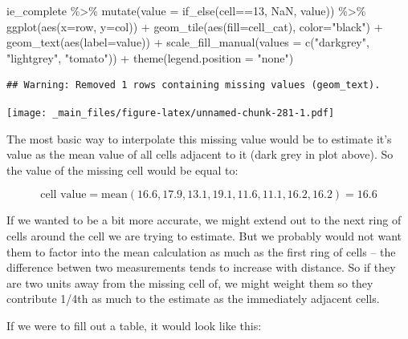 \documentclass[
]{book}
\newenvironment{Shaded}{\begin{snugshade}}{\end{snugshade}}
\newcommand{\AttributeTok}[1]{\textcolor[rgb]{0.77,0.63,0.00}{#1}}
\newcommand{\ConstantTok}[1]{\textcolor[rgb]{0.00,0.00,0.00}{#1}}
\newcommand{\DecValTok}[1]{\textcolor[rgb]{0.00,0.00,0.81}{#1}}
\newcommand{\FunctionTok}[1]{\textcolor[rgb]{0.00,0.00,0.00}{#1}}
\newcommand{\NormalTok}[1]{#1}
\newcommand{\SpecialCharTok}[1]{\textcolor[rgb]{0.00,0.00,0.00}{#1}}
\newcommand{\StringTok}[1]{\textcolor[rgb]{0.31,0.60,0.02}{#1}}
\begin{document}
\begin{Shaded}
\begin{Highlighting}[]
\NormalTok{ie\_complete }\SpecialCharTok{\%\textgreater{}\%} 
  \FunctionTok{mutate}\NormalTok{(}\AttributeTok{value =} \FunctionTok{if\_else}\NormalTok{(cell}\SpecialCharTok{==}\DecValTok{13}\NormalTok{, }\ConstantTok{NaN}\NormalTok{, value)) }\SpecialCharTok{\%\textgreater{}\%}
  \FunctionTok{ggplot}\NormalTok{(}\FunctionTok{aes}\NormalTok{(}\AttributeTok{x=}\NormalTok{row, }\AttributeTok{y=}\NormalTok{col)) }\SpecialCharTok{+}
  \FunctionTok{geom\_tile}\NormalTok{(}\FunctionTok{aes}\NormalTok{(}\AttributeTok{fill=}\NormalTok{cell\_cat), }\AttributeTok{color=}\StringTok{"black"}\NormalTok{) }\SpecialCharTok{+}
  \FunctionTok{geom\_text}\NormalTok{(}\FunctionTok{aes}\NormalTok{(}\AttributeTok{label=}\NormalTok{value)) }\SpecialCharTok{+}
  \FunctionTok{scale\_fill\_manual}\NormalTok{(}\AttributeTok{values =} \FunctionTok{c}\NormalTok{(}\StringTok{"darkgrey"}\NormalTok{, }\StringTok{"lightgrey"}\NormalTok{, }\StringTok{"tomato"}\NormalTok{)) }\SpecialCharTok{+}
  \FunctionTok{theme}\NormalTok{(}\AttributeTok{legend.position =} \StringTok{"none"}\NormalTok{)}
\end{Highlighting}
\end{Shaded}

\begin{verbatim}
## Warning: Removed 1 rows containing missing values (geom_text).
\end{verbatim}

\texttt{[image: \_main\_files/figure-latex/unnamed-chunk-281-1.pdf]}

The most basic way to interpolate this missing value would be to estimate it's value as the mean value of all cells adjacent to it (dark grey in plot above). So the value of the missing cell would be equal to:

\[ \text{cell value} = \text{mean}(16.6, 17.9, 13.1, 19.1, 11.6, 11.1, 16.2, 16.2) = 16.6 \]

If we wanted to be a bit more accurate, we might extend out to the next ring of cells around the cell we are trying to estimate. But we probably would not want them to factor into the mean calculation as much as the first ring of cells -- the difference betwen two measurements tends to increase with distance. So if they are two units away from the missing cell of, we might weight them so they contribute 1/4th as much to the estimate as the immediately adjacent cells.

If we were to fill out a table, it would look like this:
\end{document}

